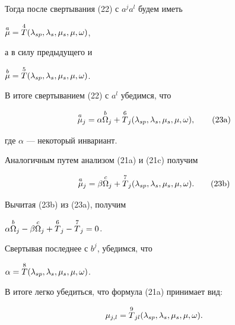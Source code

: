 Тогда после свертывания (22) с $a^ja^l$ будем иметь


$\overset{a}{\mu}{}=\overset{4}{T}{}(\lambda_{sp},\lambda_s,\mu_s,\mu ,\omega )$,


а в силу предыдущего и


$\overset{b}{\mu}{}=\overset{5}{T}{}(\lambda_{sp},\lambda_s,\mu_s,\mu ,\omega )$.





В итоге свертыванием (22) с $a^l$ убедимся, что 


\begin{equation}


\up{a}{\mu}_j=\alpha \up{b}{\Omega}_j+\up{6}{T}_j(\lambda_{sp},\lambda_s,\mu


_s,\mu ,\omega ),\tag{23\text{a}}


\end{equation}


где $\alpha$ --- некоторый инвариант.


Аналогичным путем анализом (21a) и (21c) получим 


\begin{equation}


\up{a}{\mu}_j=\beta \up{c}{\Omega}_j+\up{7}{T}_j(\lambda_{sp},\lambda_s,\mu


_s,\mu ,\omega ).\tag{23\text{b}}


\end{equation}


\addtocounter{equation}{1}








\noindent{}Вычитая (23b) из (23a), получим


$\alpha \overset{b}{\Omega}{}_j-\beta \overset{c}{\Omega}{}_j+\overset{6}{T}{}_j-\overset{7}{T}{}_j=0$.


Свертывая последнее с $b^j$, убедимся, что


$\alpha =\overset{8}{T}{}(\lambda_{sp},\lambda_s,\mu_s,\mu ,\omega )$.


В итоге легко убедиться, что формула (21a) принимает вид:


\begin{equation}


\mu_{j,l}=\up{9}{T}_{jl}(\lambda_{sp},\lambda_s,\mu


_s,\mu ,\omega ).


\end{equation}





